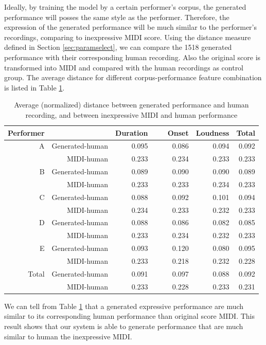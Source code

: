 Ideally, by training the model by a certain performer's corpus, the generated performance will posses the same style as the performer. Therefore, the expression of the generated performance will be much similar to the performer's recordings, comparing to inexpressive MIDI score. Using the distance measure defined in Section \ref{sec:paramselect}, we can compare the 1518 generated performance with their corresponding human recording. Also the original score is transformed into MIDI and compared with the human recordings as control group. The average distance for different corpus-performance feature combination is listed in Table \ref{tab:corr}.
\begin{table}
   \centering
   \caption{Average (normalized) distance between generated performance and human recording, and between inexpressive MIDI and human performance}
   \label{tab:corr}
   \begin{tabular}{rr|rrr|r}
\hline
Performer&&Duration&\ \ \ Onset&Loudness&Total\\
\hline
A&Generated-human&0.095&0.086&0.094&0.092\\
&MIDI-human&0.233&0.234&0.233&0.233\\
\hline
B&Generated-human&0.089&0.090&0.090&0.089\\
&MIDI-human&0.233&0.233&0.234&0.233\\
\hline
C&Generated-human&0.088&0.092&0.101&0.094\\
&MIDI-human&0.234&0.233&0.232&0.233\\
\hline
D&Generated-human&0.088&0.086&0.082&0.085\\
&MIDI-human&0.233&0.234&0.232&0.233\\
\hline
E&Generated-human&0.093&0.120&0.080&0.095\\
&MIDI-human&0.233&0.218&0.232&0.228\\
\hline
Total&Generated-human&0.091&0.097&0.088&0.092\\
&MIDI-human&0.233&0.228&0.233&0.231\\
\hline
   \end{tabular}
\end{table}

We can tell from Table \ref{tab:corr} that a generated expressive performance are much similar to its corresponding human performance than original score MIDI. This result shows that our system is able to generate performance that are much similar to human the inexpressive MIDI.


